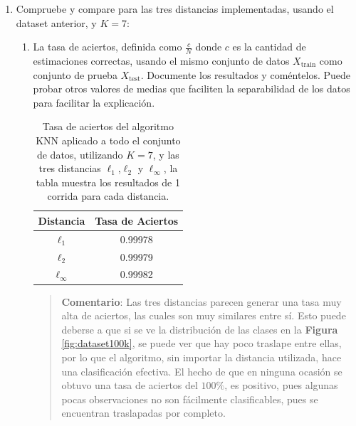\documentclass{article}
\begin{document}
\begin{enumerate}
\vspace{0.5cm}

\item Compruebe y compare para las tres distancias implementadas, usando el dataset anterior, y $K=7$:
\begin{enumerate}
\item La tasa de aciertos, definida como $\frac{c}{N}$ donde $c$ es la cantidad de estimaciones correctas, usando el mismo conjunto de datos $X_{\textrm{train}}$ como conjunto de prueba $X_{\textrm{test}}$.
Documente los resultados y coméntelos. Puede probar otros valores de medias que faciliten la separabilidad de los datos para facilitar la explicación. 

\begin{table}[H]
    \centering
    \begin{tabular}{c|c}    
        \textbf{Distancia} & \textbf{Tasa de Aciertos} \\
        \hline        
        $\ell_{1}$ &  0.99978\\
        $\ell_{2}$ &  0.99979\\
        $\ell_{\infty}$ &  0.99982\\
    \end{tabular}    
    \caption{\centering \small Tasa de aciertos del algoritmo KNN aplicado a todo el conjunto de datos, utilizando $K=7$, y las tres distancias $\ell_{1}$,$\ell_{2}$ y $\ell_{\infty}$, la tabla muestra los resultados de 1 corrida para cada distancia.}
    \label{tab:resultados_knn_dateset_completo}
\end{table}

\begin{quote}
\textbf{Comentario}: Las tres distancias parecen generar una tasa muy alta de aciertos, las cuales son muy similares entre sí. Esto puede deberse a que si se ve la distribución de las clases en la \textbf{Figura} \ref{fig:dataset100k}, se puede ver que hay poco traslape entre ellas, por lo que el algoritmo, sin importar la distancia utilizada, hace una clasificación efectiva. El hecho de que en ninguna ocasión se obtuvo una tasa de aciertos del $100\%$, es positivo, pues algunas pocas observaciones no son fácilmente clasificables, pues se encuentran traslapadas por completo.
\end{quote}

\vspace{0.5cm}


\end{enumerate}
\end{enumerate}
\end{document}
